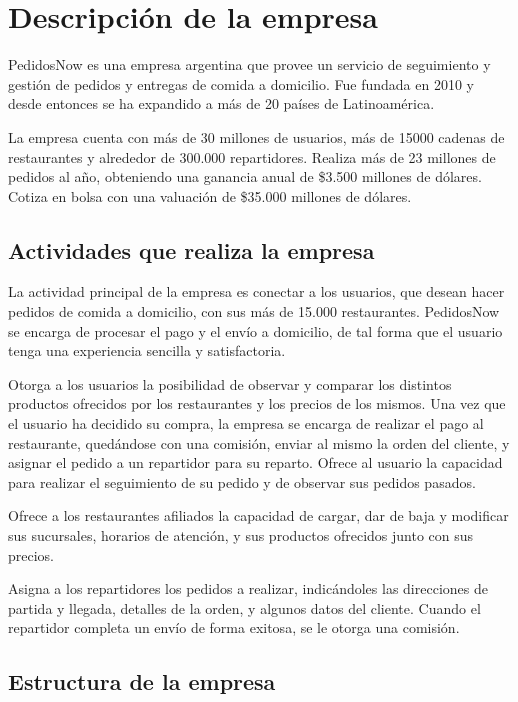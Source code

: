 \documentclass[11pt]{article}
\begin{document}
\newpage

\tableofcontents

\newpage
\section{Descripción de la empresa}
PedidosNow es una empresa argentina que provee un servicio de seguimiento y gestión de pedidos y entregas de comida a domicilio. Fue fundada en 2010 y desde entonces se ha expandido a más de 20 países de Latinoamérica.

La empresa cuenta con más de 30 millones de usuarios, más de 15000 cadenas de restaurantes y alrededor de 300.000 repartidores. Realiza más de 23 millones de pedidos al año, obteniendo una ganancia anual de \$3.500 millones de dólares. Cotiza en bolsa con una valuación de \$35.000 millones de dólares.

\subsection{Actividades que realiza la empresa}

La actividad principal de la empresa es conectar a los usuarios, que desean hacer pedidos de comida a domicilio, con sus más de 15.000 restaurantes. PedidosNow se encarga de procesar el pago y el envío a domicilio, de tal forma que el usuario tenga una experiencia sencilla y satisfactoria.

Otorga a los usuarios la posibilidad de observar y comparar los distintos productos ofrecidos por los restaurantes y los precios de los mismos. Una vez que el usuario ha decidido su compra, la empresa se encarga de realizar el pago al restaurante, quedándose con una comisión, enviar al mismo la orden del cliente, y asignar el pedido a un repartidor para su reparto. Ofrece al usuario la capacidad para realizar el seguimiento de su pedido y de observar sus pedidos pasados.

Ofrece a los restaurantes afiliados la capacidad de cargar, dar de baja y modificar sus sucursales, horarios de atención, y sus productos ofrecidos junto con sus precios.

Asigna a los repartidores los pedidos a realizar, indicándoles las direcciones de partida y llegada, detalles de la orden, y algunos datos del cliente. Cuando el repartidor completa un envío de forma exitosa, se le otorga una comisión.


\subsection{Estructura de la empresa}
\end{document}

